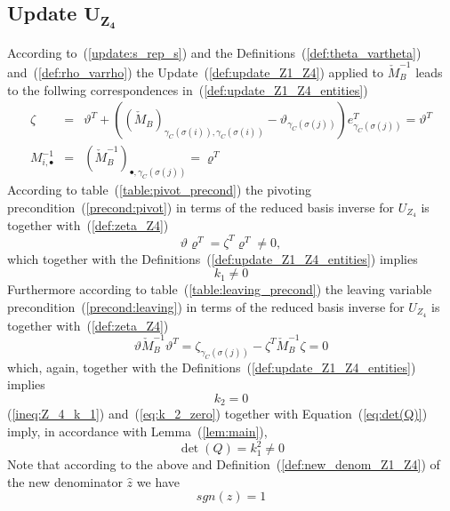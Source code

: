 \documentclass[a4paper]{article}
\begin{document}
\subsection{Update $\mathbf{U_{Z_{4}}}$}
According to~(\ref{update:s_rep_s}) and the
Definitions~(\ref{def:theta_vartheta})
and~(\ref{def:rho_varrho})
the Update~(\ref{def:update_Z1_Z4})
applied to $\check{M}_{B}^{-1}$ leads to the follwing correspondences
in~(\ref{def:update_Z1_Z4_entities})
\begin{eqnarray}
\label{def:zeta_Z4}
\zeta
&=&
\vartheta^{T} 
+ 
\left(
  \left(\check{M}_{B}\right)_{\gamma_{C}(\sigma(i)),\gamma_{C}(\sigma(i))}
  - \vartheta_{\gamma_{C}(\sigma(j))}
\right)
e_{\gamma_{C}(\sigma(j))}^{T}
=
\vartheta^{T} 
\\
M_{i, \bullet}^{-1}
&=&
\left(\check{M}_{B}^{-1}\right)_{\bullet, \gamma_{C}(\sigma(j))}
=
\varrho^{T}
\end{eqnarray}
According to table~(\ref{table:pivot_precond}) the
pivoting precondition~(\ref{precond:pivot})
in terms of the reduced basis inverse for $U_{Z_{4}}$ is together
with~(\ref{def:zeta_Z4})
\begin{equation*}
\vartheta \varrho^{T}= \zeta^{T} \varrho^{T} \neq 0,
\end{equation*}
which together with the Definitions~(\ref{def:update_Z1_Z4_entities}) implies 
\begin{equation}
\label{ineq:Z_4_k_1}
k_{1} \neq 0
\end{equation}
Furthermore according to table~(\ref{table:leaving_precond})
the leaving variable precondition~(\ref{precond:leaving})
in terms of the reduced basis inverse for $U_{Z_{4}}$ is
together with~(\ref{def:zeta_Z4})
\begin{equation*}
\vartheta\check{M}_{B}^{-1}\vartheta^{T}
=
\zeta_{\gamma_{C}(\sigma(j))}-\zeta^{T}\check{M}_{B}^{-1}\zeta= 0 
\end{equation*}
which, again, together with the Definitions~(\ref{def:update_Z1_Z4_entities})
implies
\begin{equation}
\label{eq:k_2_zero}
k_{2} = 0
\end{equation}
(\ref{ineq:Z_4_k_1}) and~(\ref{eq:k_2_zero}) together with
Equation~(\ref{eq:det(Q)}) imply, in accordance with Lemma~(\ref{lem:main}),  
\begin{equation}
\det(Q)=k_{1}^{2} \neq 0
\end{equation}
Note that according to the above and
Definition~(\ref{def:new_denom_Z1_Z4}) of the new denominator
$\hat{z}$ we have
\begin{equation}
sgn(\hat{z}) = 1
\end{equation}  
\end{document}

